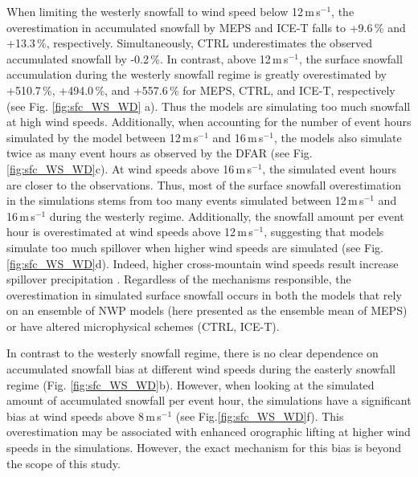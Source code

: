 \documentclass{ametsocV5}
\begin{document}
		When limiting the westerly snowfall to wind speed below 12\,m\,s$^{-1}$, the overestimation in accumulated snowfall by MEPS and ICE-T falls to +9.6\,\% and +13.3\,\%, respectively. Simultaneously, CTRL underestimates the observed accumulated snowfall by -0.2\,\%. In contrast, above 12\,m\,s$^{-1}$, the surface snowfall accumulation during the westerly snowfall regime is greatly overestimated by +510.7\,\%, +494.0\,\%, and +557.6\,\% for MEPS, CTRL, and ICE-T, respectively (see Fig. \ref{fig:sfc_WS_WD} a). Thus the models are simulating too much snowfall at high wind speeds. Additionally, when accounting for the number of event hours simulated by the model between 12\,m\,s$^{-1}$ and 16\,m\,s$^{-1}$, the models also simulate twice as many event hours as observed by the DFAR (see Fig. \ref{fig:sfc_WS_WD}c). At wind speeds above 16\,m\,s$^{-1}$, the simulated event hours are closer to the observations. Thus, most of the surface snowfall overestimation in the simulations stems from too many events simulated between 12\,m\,s$^{-1}$ and 16\,m\,s$^{-1}$ during the westerly regime. Additionally, the snowfall amount per event hour is overestimated at wind speeds above 12\,m\,s$^{-1}$, suggesting that models simulate too much spillover when higher wind speeds are simulated (see Fig. \ref{fig:sfc_WS_WD}d). Indeed, higher cross-mountain wind speeds result increase spillover precipitation \citep{chater_atmospheric_1998,kaplan_role_2012}. Regardless of the mechanisms responsible, the overestimation in simulated surface snowfall occurs in both the models that rely on an ensemble of NWP models (here presented as the ensemble mean of MEPS) or have altered microphysical schemes (CTRL, ICE-T). 

		In contrast to the westerly snowfall regime, there is no clear dependence on accumulated snowfall bias at different wind speeds during the easterly snowfall regime (Fig. \ref{fig:sfc_WS_WD}b). 
		However, when looking at the simulated amount of accumulated snowfall per event hour, the simulations have a significant bias at wind speeds above 8\,m\,s$^{-1}$ (see Fig.\ref{fig:sfc_WS_WD}f). This overestimation may be associated with enhanced orographic lifting at higher wind speeds in the simulations. However, the exact mechanism for this bias is beyond the scope of this study.
\end{document}

